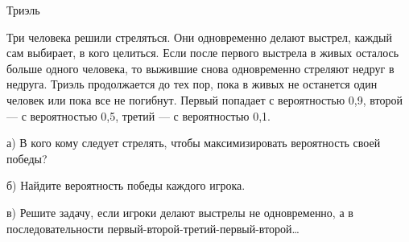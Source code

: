 \begin{problem}
 Триэль\par
Три человека решили стреляться. Они одновременно делают выстрел, каждый сам выбирает, в кого целиться. Если после первого выстрела в живых осталось больше одного человека, то выжившие снова одновременно стреляют недруг в недруга. Триэль продолжается до тех пор, пока в живых не останется один человек или пока все не погибнут. Первый попадает с вероятностью 0,9, второй  — с вероятностью 0,5, третий — с вероятностью 0,1.\par
а) В кого кому следует стрелять, чтобы максимизировать вероятность своей победы?\par
б) Найдите вероятность победы каждого игрока.\par
в) Решите задачу, если игроки делают выстрелы не одновременно, а в последовательности первый-второй-третий-первый-второй\ldots



\begin{sol}

\end{sol}
\end{problem}




